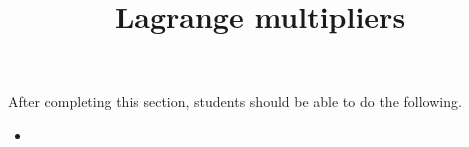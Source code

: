 \documentclass{ximera}
\title{Lagrange multipliers}
\begin{document}
\begin{abstract}
\end{abstract}

\maketitle

\begin{sectionOutcomes}

After completing this section, students should be able to do the following.

\begin{itemize}
\item 
\end{itemize}

\end{sectionOutcomes}
\end{document}
